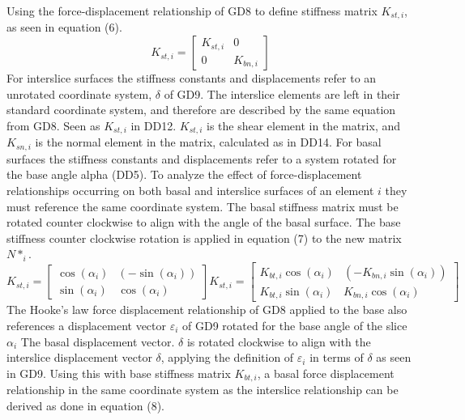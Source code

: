 \documentclass[12pt]{article}
\begin{document}
Using the force-displacement relationship of GD8 to define stiffness matrix $K_{st,i}$, as seen in equation (6).
\begin{equation}
K_{st,i}=\begin{bmatrix}
K_{st,i} & 0\\
0 & K_{bn,i}
\end{bmatrix}
\end{equation}
For interslice surfaces the stiffness constants and displacements refer to an unrotated coordinate system, $\delta{}$ of GD9. The interslice elements are left in their standard coordinate system, and therefore are described by the same equation from GD8. Seen as $K_{st,i}$ in DD12. $K_{st,i}$ is the shear element in the matrix, and $K_{sn,i}$ is the normal element in the matrix, calculated as in DD14.
For basal surfaces the stiffness constants and displacements refer to a system rotated for the base angle alpha (DD5). To analyze the effect of force-displacement relationships occurring on both basal and interslice surfaces of an element $i$ they must reference the same coordinate system. The basal stiffness matrix must be rotated counter clockwise to align with the angle of the basal surface. The base stiffness counter clockwise rotation is applied in equation (7) to the new matrix $N*_{i}$.
\begin{equation}
K_{st,i}=\begin{bmatrix}
\cos\left(\alpha{}_{i}\right) & \left(-\sin\left(\alpha{}_{i}\right)\right)\\
\sin\left(\alpha{}_{i}\right) & \cos\left(\alpha{}_{i}\right)
\end{bmatrix}K_{st,i}=\begin{bmatrix}
K_{bt,i}\cos\left(\alpha{}_{i}\right) & \left(-K_{bn,i}\sin\left(\alpha{}_{i}\right)\right)\\
K_{bt,i}\sin\left(\alpha{}_{i}\right) & K_{bn,i}\cos\left(\alpha{}_{i}\right)
\end{bmatrix}
\end{equation}
The Hooke's law force displacement relationship of GD8 applied to the base also references a displacement vector $\varepsilon{}_{i}$ of GD9 rotated for the base angle of the slice $\alpha{}_{i}$ The basal displacement vector. $\delta{}$ is rotated clockwise to align with the interslice displacement vector $\delta{}$, applying the definition of $\varepsilon{}_{i}$ in terms of $\delta{}$ as seen in GD9. Using this with base stiffness matrix $K_{bt,i}$, a basal force displacement relationship in the same coordinate system as the interslice relationship can be derived as done in equation (8).
\end{document}
